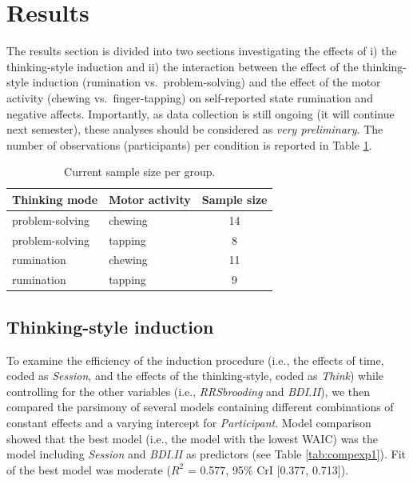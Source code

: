 \documentclass[a4paper,12pt,twoside,openright,oldfontcommands]{memoir}
\begin{document}
\hypertarget{results-4}{%
\section{Results}\label{results-4}}

The results section is divided into two sections investigating the effects of i) the thinking-style induction and ii) the interaction between the effect of the thinking-style induction (rumination vs.~problem-solving) and the effect of the motor activity (chewing vs.~finger-tapping) on self-reported state rumination and negative affects. Importantly, as data collection is still ongoing (it will continue next semester), these analyses should be considered as \emph{very preliminary}. The number of observations (participants) per condition is reported in Table \ref{tab:sampleszize}.

\begin{table}[H]
\begin{center}
\begin{threeparttable}
\caption{\label{tab:sampleszize}Current sample size per group.}
\begin{tabular}{llc}
\toprule
Thinking mode & Motor activity & Sample size\\
\midrule
problem-solving & chewing & 14\\
problem-solving & tapping & 8\\
rumination & chewing & 11\\
rumination & tapping & 9\\
\bottomrule
\end{tabular}
\end{threeparttable}
\end{center}
\end{table}

\hypertarget{thinking-style-induction-1}{%
\subsection{Thinking-style induction}\label{thinking-style-induction-1}}

To examine the efficiency of the induction procedure (i.e., the effects of time, coded as \emph{Session}, and the effects of the thinking-style, coded as \emph{Think}) while controlling for the other variables (i.e., \emph{RRSbrooding} and \emph{BDI.II}), we then compared the parsimony of several models containing different combinations of constant effects and a varying intercept for \emph{Participant}. Model comparison showed that the best model (i.e., the model with the lowest WAIC) was the model including \emph{Session} and \emph{BDI.II} as predictors (see Table \ref{tab:compexp1}). Fit of the best model was moderate (\(R^2\) = 0.577, 95\% CrI {[}0.377, 0.713{]}).
\end{document}

